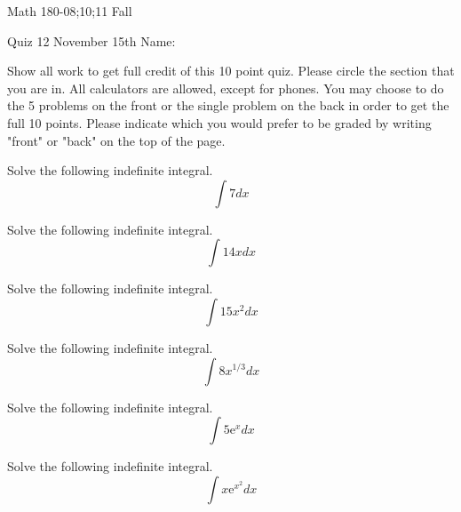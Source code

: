 \documentclass[11pt,epsfig]{article}
\begin{document}
Math 180-08;10;11 Fall

Quiz 12 November 15th \hspace{1.9in} {Name:} {\underline {\hspace{2.5in}}}
\vspace{2pc}

Show all work to get full credit of this 10 point quiz. Please circle the section that you are in. All calculators are allowed, except for phones. You may choose to do the 5 problems on the front or the single problem on the back in order to get the full 10 points. Please indicate which you would prefer to be graded by writing "front" or "back" on the top of the page. 
\vspace{2pc}

\begin{problem}{2}
Solve the following indefinite integral.
\begin{equation*}
\int 7dx
\end{equation*}
\vfill
\end{problem}

\begin{problem}{2}
Solve the following indefinite integral.
\begin{equation*}
\int 14xdx
\end{equation*}
\vfill
\end{problem}

\begin{problem}{2}
Solve the following indefinite integral.
\begin{equation*}
\int 15 x^2 dx
\end{equation*}
\vfill
\end{problem}

\begin{problem}{2}
Solve the following indefinite integral.
\begin{equation*}
\int 8 x^{1/3} dx
\end{equation*}
\vfill
\end{problem}

\begin{problem}{2}
Solve the following indefinite integral.
\begin{equation*}
\int 5 \mathrm{e}^x dx
\end{equation*}
\vfill
\end{problem}

\newpage

\begin{problem}{10}
Solve the following indefinite integral.
\begin{equation*}
\int x \mathrm{e} ^{x^2} dx
\end{equation*}
\vfill
\end{problem}






\showpoints
\end{document}

